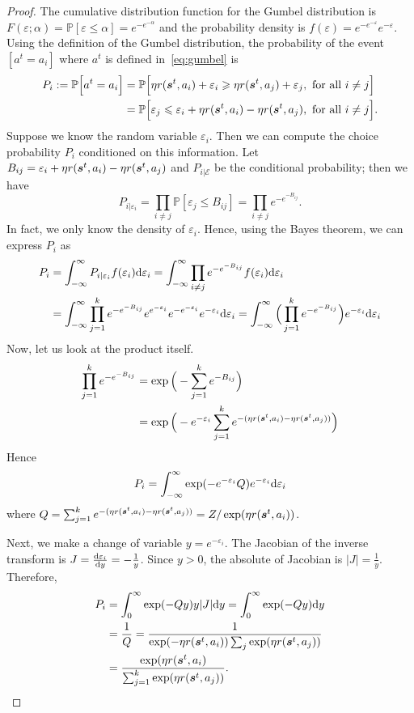 \documentclass{article} %
\begin{document}
\begin{proof}
The cumulative distribution function for the Gumbel distribution is $F(\varepsilon;\alpha) = \mathbb{P}[\varepsilon \leqslant \alpha ] = e^{-e^{-\alpha}}$ and the probability density is $f(\varepsilon) = e^{-e^{-\varepsilon}}e^{-\varepsilon} $. Using the definition of the Gumbel distribution, the probability of the event $[a^t = a_i]$ where $a^t$ is defined in~\eqref{eq:gumbel} is 
\begin{align*}
    P_i :=  \mathbb{P} \Big[a^t = a_i\Big] &= \mathbb{P} \Big[ \eta r({\bm{s}}^t,a_i) +\varepsilon_i \geqslant \eta r({\bm{s}}^t,a_j) +\varepsilon_j ,  \text{ for all } i\neq j \Big]\\
    & =  \mathbb{P} \Big[\varepsilon_j \leqslant\varepsilon_i + \eta r({\bm{s}}^t,a_i)-\eta r({\bm{s}}^t,a_j),  \text{ for all } i\neq j \Big].
\end{align*}
Suppose we know the random variable $\varepsilon_i$. Then we can compute the choice probability $P_i$ conditioned on this information. Let $B_{ij} = \varepsilon_i +\eta r({\bm{s}}^t,a_i)-\eta r({\bm{s}}^t,a_j) $ and $P_{i|\mathcal{E}}$ be the conditional probability; then we have
\[
P_{i|\varepsilon_i} = \prod_{i \neq j} \mathbb{P}[\varepsilon_{j} \leqslant B_{ij}] = \prod_{i \neq j} e^{-e^{-B_{ij}}}.
\]
In fact, we only know the density of $\varepsilon_i$. Hence, using the Bayes theorem, we can express $P_i$ as
\begin{align*}
P_i & = \int_{-\infty}^{\infty} P_{i|\varepsilon_i} f(\varepsilon_i) {\textnormal{d}} \varepsilon_i = \int_{-\infty}^{\infty} \prod_{i \neq j} e^{-e^{-B_{ij}}} f(\varepsilon_i) {\textnormal{d}} \varepsilon_i \\
&  = \int_{-\infty}^{\infty} \prod_{j=1}^k e^{-e^{-B_{ij}}}   e^{e^{-\varepsilon_i}} e^{-e^{-\varepsilon_i}}e^{-\varepsilon_i} {\textnormal{d}} \varepsilon_i= \int_{-\infty}^{\infty} \Big( \prod_{j=1}^k e^{-e^{-B_{ij}}} \Big)  e^{-\varepsilon_i} {\textnormal{d}} \varepsilon_i
\end{align*}
Now, let us look at the product itself.
\begin{align*}
\prod_{j=1}^k e^{-e^{-B_{ij}}} & = \exp\Big( -\sum_{j=1}^k e^{-B_{ij}}\Big) \\
& = \exp \Big( - e^{-\varepsilon_i }\sum_{j=1}^k e^{- (\eta r({\bm{s}}^t,a_i)-\eta r({\bm{s}}^t,a_j) )} \Big)
\end{align*}
Hence 
\[
P_i = \int_{-\infty}^{\infty} \exp(-e^{-\varepsilon_i } Q ) e^{-\varepsilon_i} {\textnormal{d}} \varepsilon_i
\]
    where $Q = \sum_{j=1}^k e^{- (\eta r({\bm{s}}^t,a_i)-\eta r({\bm{s}}^t,a_j) )}  = Z/\exp(\eta r({\bm{s}}^t,a_i) )$. 

Next, we make a change of variable $y = e^{-\varepsilon_i}$. The Jacobian of the inverse transform is $J = \frac{{\textnormal{d}} \varepsilon_i}{{\textnormal{d}} y} = -\frac{1}{y}$. Since $y>0$, the absolute of Jacobian is $|J| = \frac{1}{y}$. Therefore, 
\begin{align*}
P_i & = \int_{0}^{\infty} \exp(-Q y) y |J| {\textnormal{d}} y=\int_{0}^{\infty} \exp(-Q y){\textnormal{d}} y	\\
& = \frac{1}{Q} = \frac{1}{\exp(-\eta r({\bm{s}}^t,a_i)) \sum_j \exp(\eta r({\bm{s}}^t,a_j))}\\
& = \dfrac{\exp(\eta r({\bm{s}}^t, a_i)}{\sum_{j=1}^k \exp(\eta r({\bm{s}}^t, a_j))}.
\end{align*}
\end{proof}
\end{document}
